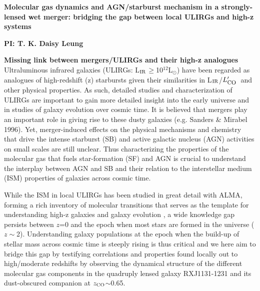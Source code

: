 \documentclass[12pt,a4paper]{article}  %
\newcommand{\Lsun}{\mbox{L$_{\odot}$}\xspace}
\newcommand{\LIR}{\mbox{L$_{\rm IR}$}\xspace}
\newcommand{\Lp}[1][CO]{\mbox{$L^{\prime}_\textrm{\fontsize{8pt}{12pt}\selectfont{#1}}$}}
\begin{document}
\pagestyle{plain}
 
\begin{center}
{\large{\bf
{ 
Molecular gas dynamics and AGN/starburst mechanism in a
strongly-lensed wet merger: bridging the gap between local ULIRGs and high-z systems}
}}
\end{center}
\vspace{-0.545em}
\centerline{\normalsize{\bf PI: 
{T. K. Daisy Leung}}} 
\vspace{0.1em} {\bf Missing link between mergers/ULIRGs and their high-z analogues} 
Ultraluminous infrared galaxies (ULIRGs: \LIR$\geq$10$^{12}$\Lsun) have been
regarded as analogues of high-redshift (z) starbursts given their
similarities in \LIR/\Lp\ and other physical properties.
As such, detailed studies and characterization of ULIRGs are important 
to gain more detailed insight into the early universe and in studies of galaxy evolution over cosmic time.
It is believed that mergers play an important role in giving rise to these dusty galaxies
(e.g. Sanders \& Mirabel 1996). Yet, merger-induced effects on the physical mechanisms and chemistry 
that drive the intense starburst (SB) and active galactic nucleus (AGN) activities on small scales are still unclear.
Thus characterizing the properties of the molecular gas that fuels star-formation (SF) and AGN is
crucial to understand the interplay between AGN and SB
and their relation to the interstellar medium (ISM) properties of galaxies across cosmic time.

While the ISM in local ULIRGs has been studied in great detail with ALMA,
forming a rich inventory of molecular transitions that serves as the template for 
understanding high-z galaxies and galaxy evolution \citep[e.g.][]{Rangwala15a}, a wide knowledge gap persists
between $z$=0 and the epoch when most stars are formed in the universe ($z\sim$2). 
Understanding galaxy populations at the epoch when the build-up of stellar mass across cosmic
time is steeply rising is thus critical and we here aim to bridge this gap by testifying
correlations and properties found locally out to high/moderate redshifts by observing the 
dynamical structure of the different molecular gas components
in the quadruply lensed galaxy RXJ1131-1231 and its dust-obscured 
companion at $z_{\rm CO}$$\sim$0.65.
\end{document}
